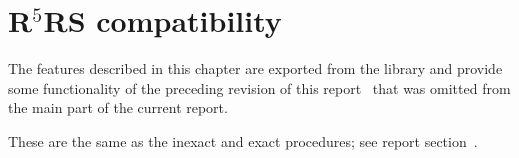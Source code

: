 \chapter{R$^5$RS compatibility}
\label{r5rscompatchapter}

The features described in this chapter are exported from the
 library and provide some functionality of the
preceding revision of this report~\cite{R5RS} that was omitted from
the main part of the current report.

\begin{entry}{%
}

These are the same as the {\cf inexact} and {\cf exact}
procedures; see report section~.
\end{entry}

